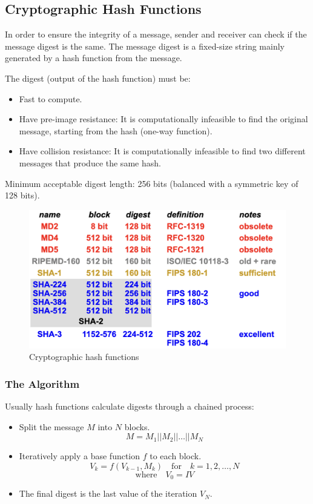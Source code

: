 \subsection{Cryptographic Hash Functions}

In order to ensure the integrity of a message, sender and receiver can check if the message digest is the same. The message digest is a fixed-size string mainly generated by a hash function from the message.

\vspace{0.1cm}

\noindent The digest (output of the hash function) must be:
\begin{itemize}
    \item Fast to compute.
    \item Have pre-image resistance: It is computationally infeasible to find the original message, starting from the hash (one-way function).
    \item Have collision resistance: It is computationally infeasible to find two different messages that produce the same hash.
\end{itemize}

Minimum acceptable digest length: 256 bits (balanced with a symmetric key of 128 bits).

\begin{figure}[H]
    \centering
    \includegraphics[width=0.5\linewidth]{Images/Cryptography/crypto_hash_functions.png}
    \caption{Cryptographic hash functions}
\end{figure}

\begin{center}
    \subsubsection*{The Algorithm}
\end{center}
Usually hash functions calculate digests through a chained process:
\begin{itemize}
    \item Split the message $M$ into $N$ blocks.
    \[
        M = M_1 || M_2 || \dots || M_N
    \]
    \item Iteratively apply a base function $f$ to each block.
    \[
        V_k = f(V_{k-1}, M_k) \quad \text{for} \quad k=1,2,\dots,N
    \]
    \[  
        \text{where} \quad V_0 = IV
    \]
    \item The final digest is the last value of the iteration $V_N$.
\end{itemize}

